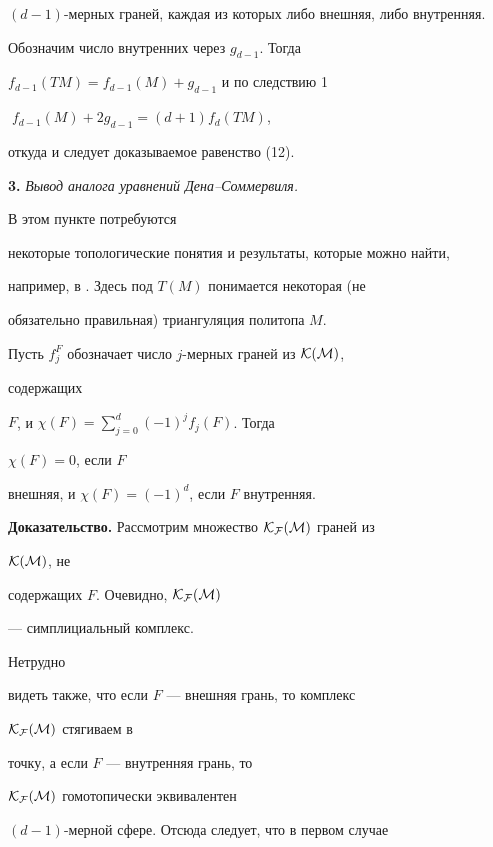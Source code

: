 $(d-1)$-мерных граней, каждая из которых либо внешняя, либо внутренняя.


Обозначим число внутренних через $g_{d-1}$. Тогда


$f_{d-1}(TM)=f_{d-1}(M)+g_{d-1}$ и по следствию 1


$\;f_{d-1}(M)+2g_{d-1}=(d+1)f_d(TM)$,


откуда и следует доказываемое равенство (12).


\medskip





{\bf 3.} {\it Вывод аналога уравнений Дена--Соммервиля.}


В этом пункте потребуются


некоторые топологические понятия и результаты, которые можно найти,


например, в \cite{Bor}. Здесь под $T(M)$ понимается некоторая (не


обязательно правильная) триангуляция политопа $M$.





\begin{lem}


Пусть $f_j^F$ обозначает число $j$-мерных граней из $\cal K(M)$,


содержащих


$F$, и $\chi(F)=\sum\limits^d_{j=0}(-1)^j f_j(F)$. Тогда


$\chi(F)=0$, если $F$


внешняя, и $\chi(F)=(-1)^d$, если $F$ внутренняя.


\end{lem}





{\bf Доказательство.} Рассмотрим множество $\cal K_F(M)$ граней из


$\cal K(M)$, не


содержащих $F$. Очевидно, $\cal K_F(M)$


--- симплициальный комплекс.


Нетрудно


видеть также, что если $F$ --- внешняя грань, то комплекс


$\cal K_F(M)$ стягиваем в


точку, а если $F$ --- внутренняя грань, то


$\cal K_F(M)$ гомотопически эквивалентен


$(d-1)$-мерной сфере. Отсюда следует, что в первом случае


